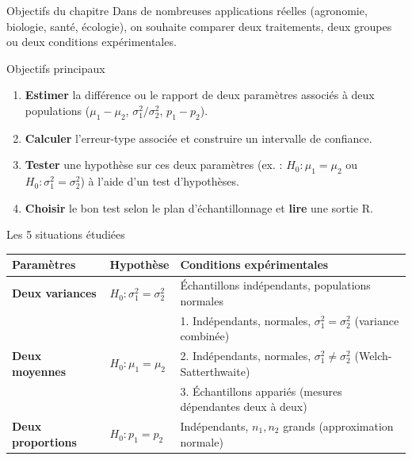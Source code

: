 \documentclass{BeamerTemplate}
\begin{document}
\begin{frame}[t]{Objectifs du chapitre}
  Dans de nombreuses applications réelles (agronomie, biologie, santé, écologie), on souhaite \alert{comparer deux traitements, deux groupes ou deux conditions expérimentales}.

  \medskip
  \begin{Boite}{Objectifs principaux}
    \begin{enumerate}\itemsep 2mm
      \item \textbf{Estimer} la différence ou le rapport de deux paramètres associés à deux populations ($\mu_1 - \mu_2$, $\sigma_1^2/\sigma_2^2$, $p_1 - p_2$).
      \item \textbf{Calculer} l'erreur-type associée et construire un \alert{intervalle de confiance}.
      \item \textbf{Tester} une hypothèse sur ces deux paramètres (ex. : $H_0: \mu_1 = \mu_2$ ou $H_0: \sigma_1^2 = \sigma_2^2$) à l'aide d'un \alert{test d'hypothèses}.
      \item \textbf{Choisir} le bon test selon le plan d'échantillonnage et \textbf{lire} une sortie R.
    \end{enumerate}
  \end{Boite}
\end{frame}

\begin{frame}[t]{Les 5 situations étudiées}
  \scriptsize
  \renewcommand{\arraystretch}{1.25}
  \begin{tabularx}{\textwidth}{llX}\toprule
    \textbf{Paramètres} & \textbf{Hypothèse} & \textbf{Conditions expérimentales} \\ \midrule
    \textbf{Deux variances} & $H_0: \sigma_1^2 = \sigma_2^2$ & Échantillons indépendants, populations normales \\ \midrule
    \multirow{3}{*}{\textbf{Deux moyennes}} & \multirow{3}{*}{$H_0: \mu_1 = \mu_2$}
      & 1. Indépendants, normales, \alert{$\sigma_1^2 = \sigma_2^2$} (variance combinée) \\
      & & 2. Indépendants, normales, \alert{$\sigma_1^2 \ne \sigma_2^2$} (Welch-Satterthwaite) \\
      & & 3. Échantillons \alert{appariés} (mesures dépendantes deux à deux) \\ \midrule
    \textbf{Deux proportions} & $H_0: p_1 = p_2$ & Indépendants, $n_1, n_2$ grands (approximation normale) \\ \bottomrule
  \end{tabularx}

  \bigskip
\end{frame}
\end{document}
